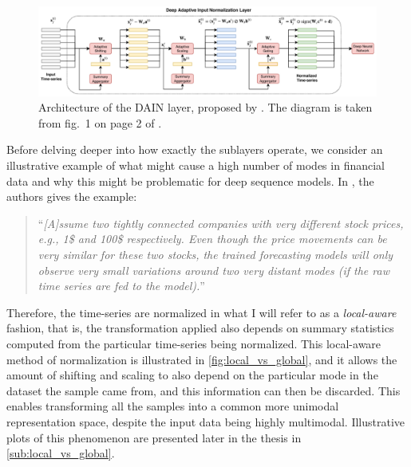 \documentclass{statsmsc}
\begin{document}
{%
\begin{figure}
    \begin{center}
        \includegraphics[width=\textwidth]{diagrams/dain_diagram.pdf}
    \end{center}
    \caption{Architecture of the \acf{DAIN} layer, proposed by \citeauthor{dain}. The diagram
    is taken from fig.\ 1 on page 2 of \cite{dain}.}
    \label{fig:dain-arch}
\end{figure}

Before delving deeper into how exactly the sublayers operate, we consider an illustrative
example of what might cause a high number of modes in financial data and why this might
be problematic for deep sequence models. In
\cite{dain}, the authors gives the example:
\begin{quote}
    ``\textit{[A]ssume two tightly
    connected companies with very different stock prices, e.g., 1\$
    and 100\$ respectively. Even though the price movements can
    be very similar for these two stocks, the trained forecasting
    models will only observe very small variations around two
    very distant modes (if the raw time series are fed to the model).}''
\end{quote}
Therefore, the time-series are normalized in what I will refer to as a
\textit{local-aware} fashion, that is, the transformation applied also depends
on summary statistics
computed from  the particular time-series being normalized. This local-aware method of normalization
is illustrated in \cref{fig:local_vs_global}, and it allows
the amount of shifting and scaling to also depend on the particular mode in the dataset the sample
came from, and this information can then be discarded.
This enables transforming all the samples into a common more unimodal
representation space, despite the input data being highly multimodal.
Illustrative plots of this phenomenon are presented later in the thesis in
\cref{sub:local_vs_global}.

}
\end{document}
